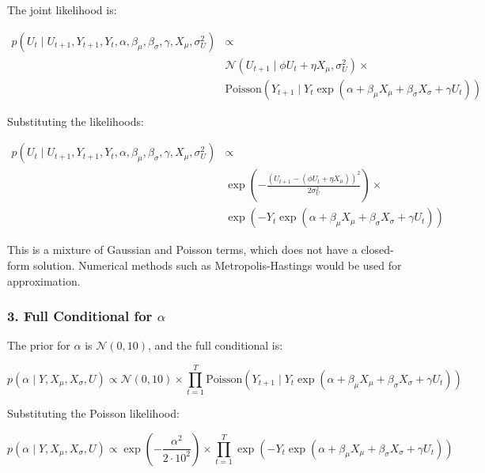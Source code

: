 \documentclass[
  letterpaper,
  DIV=11,
  numbers=noendperiod]{scrartcl}
\begin{document}
The joint likelihood is:

\begin{equation}
\begin{split}
p(U_t \mid U_{t+1}, Y_{t+1}, Y_t, \alpha, \beta_{\mu}, \beta_{\sigma}, \gamma, X_{\mu}, \sigma_U^2) & \propto \\
& \mathcal{N}(U_{t+1} \mid \phi U_t + \eta X_{\mu}, \sigma_U^2) \times \\
& \text{Poisson}(Y_{t+1} \mid Y_t \exp(\alpha + \beta_{\mu} X_{\mu} + \beta_{\sigma} X_{\sigma} + \gamma U_t))
\end{split}
\end{equation}

Substituting the likelihoods:

\begin{equation}
\begin{split}
p(U_t \mid U_{t+1}, Y_{t+1}, Y_t, \alpha, \beta_{\mu}, \beta_{\sigma}, \gamma, X_{\mu}, \sigma_U^2) &\propto \\
& \exp\left( -\frac{(U_{t+1} - (\phi U_t + \eta X_{\mu}))^2}{2 \sigma_U^2} \right) \times \\
& \exp\left( -Y_t \exp(\alpha + \beta_{\mu} X_{\mu} + \beta_{\sigma} X_{\sigma} + \gamma U_t) \right)
\end{split}
\end{equation}

This is a mixture of Gaussian and Poisson terms, which does not have a
closed-form solution. Numerical methods such as Metropolis-Hastings
would be used for approximation.

\subsubsection{\texorpdfstring{3. Full Conditional for
\(\alpha\)}{3. Full Conditional for \textbackslash alpha}}\label{full-conditional-for-alpha}

The prior for \(\alpha\) is \(\mathcal{N}(0, 10)\), and the full
conditional is:

\begin{equation}
p(\alpha \mid Y, X_{\mu}, X_{\sigma}, U) \propto \mathcal{N}(0, 10) \times \prod_{t=1}^{T} \text{Poisson}(Y_{t+1} \mid Y_t \exp(\alpha + \beta_{\mu} X_{\mu} + \beta_{\sigma} X_{\sigma} + \gamma U_t))
\end{equation}

Substituting the Poisson likelihood:

\begin{equation}
p(\alpha \mid Y, X_{\mu}, X_{\sigma}, U) \propto \exp\left( -\frac{\alpha^2}{2 \cdot 10^2} \right) \times \prod_{t=1}^{T} \exp\left( -Y_t \exp(\alpha + \beta_{\mu} X_{\mu} + \beta_{\sigma} X_{\sigma} + \gamma U_t) \right)
\end{equation}
\end{document}
